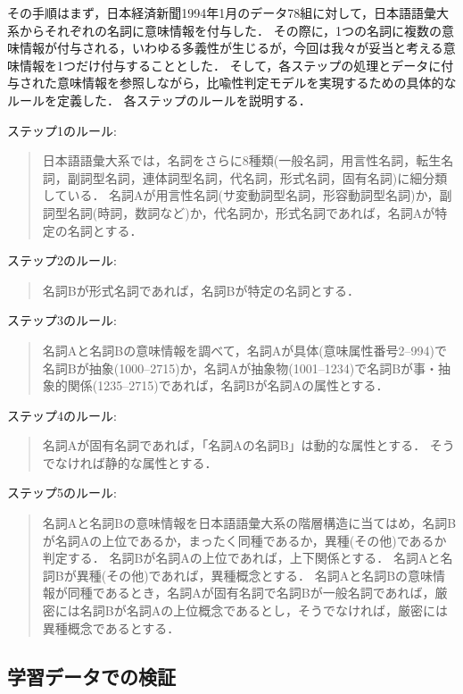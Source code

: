 その手順はまず，日本経済新聞1994年1月のデータ78組に対して，日本語語彙大系からそれぞれの名詞に意味情報を付与した．
その際に，1つの名詞に複数の意味情報が付与される，いわゆる多義性が生じるが，今回は我々が妥当と考える意味情報を1つだけ付与することとした．
そして，各ステップの処理とデータに付与された意味情報を参照しながら，比喩性判定モデルを実現するための具体的なルールを定義した．
各ステップのルールを説明する．

\medskip
ステップ1のルール:
\begin{quote}
日本語語彙大系では，名詞をさらに8種類(一般名詞，用言性名詞，転生名詞，副詞型名詞，連体詞型名詞，代名詞，形式名詞，固有名詞)に細分類している．
名詞Aが用言性名詞(サ変動詞型名詞，形容動詞型名詞)か，副詞型名詞(時詞，数詞など)か，代名詞か，形式名詞であれば，名詞Aが特定の名詞とする．
\end{quote}

\medskip
ステップ2のルール:
\begin{quote}
名詞Bが形式名詞であれば，名詞Bが特定の名詞とする．
\end{quote}

\medskip
ステップ3のルール:
\begin{quote}
名詞Aと名詞Bの意味情報を調べて，名詞Aが具体(意味属性番号2--994)で名詞Bが抽象(1000--2715)か，名詞Aが抽象物(1001--1234)で名詞Bが事・抽象的関係(1235--2715)であれば，名詞Bが名詞Aの属性とする．
\end{quote}

\medskip
ステップ4のルール:
\begin{quote}
名詞Aが固有名詞であれば，「名詞Aの名詞B」は動的な属性とする．
そうでなければ静的な属性とする．
\end{quote}

\medskip
ステップ5のルール:
\begin{quote}
名詞Aと名詞Bの意味情報を日本語語彙大系の階層構造に当てはめ，名詞Bが名詞Aの上位であるか，まったく同種であるか，異種(その他)であるか判定する．
名詞Bが名詞Aの上位であれば，上下関係とする．
名詞Aと名詞Bが異種(その他)であれば，異種概念とする．
名詞Aと名詞Bの意味情報が同種であるとき，名詞Aが固有名詞で名詞Bが一般名詞であれば，厳密には名詞Bが名詞Aの上位概念であるとし，そうでなければ，厳密には異種概念であるとする．
\end{quote}

\subsection{学習データでの検証}\label{subsec:jikken1}

